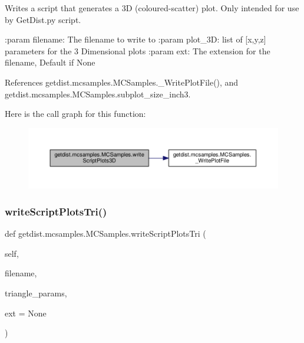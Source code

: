 \begin{DoxyVerb}Writes a script that generates a 3D (coloured-scatter) plot. Only intended for use by GetDist.py script.

:param filename: The filename to write to
:param plot_3D: list of [x,y,z] parameters for the 3 Dimensional plots
:param ext: The extension for the filename, Default if None
\end{DoxyVerb}
 

References getdist.\+mcsamples.\+M\+C\+Samples.\+\_\+\+Write\+Plot\+File(), and getdist.\+mcsamples.\+M\+C\+Samples.\+subplot\+\_\+size\+\_\+inch3.

Here is the call graph for this function\+:
\nopagebreak
\begin{figure}[H]
\begin{center}
\leavevmode
\includegraphics[width=350pt]{classgetdist_1_1mcsamples_1_1MCSamples_a244915a2af3b365f1d5f65bde7926e9c_cgraph}
\end{center}
\end{figure}
\mbox{\label{classgetdist_1_1mcsamples_1_1MCSamples_a13bcb199afa7e06273aee1b088532078}} 
\subsubsection{\texorpdfstring{write\+Script\+Plots\+Tri()}{writeScriptPlotsTri()}}
{\footnotesize\ttfamily def getdist.\+mcsamples.\+M\+C\+Samples.\+write\+Script\+Plots\+Tri (\begin{DoxyParamCaption}\item[{}]{self,  }\item[{}]{filename,  }\item[{}]{triangle\+\_\+params,  }\item[{}]{ext = {\ttfamily None} }\end{DoxyParamCaption})}

